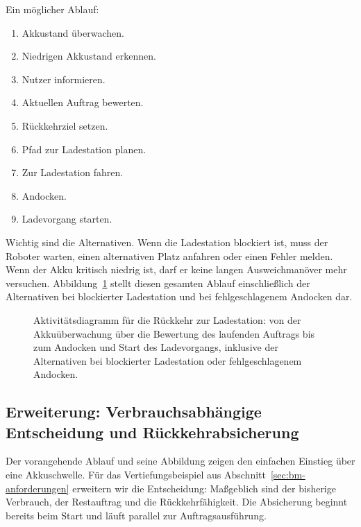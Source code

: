 Ein möglicher Ablauf:

\begin{enumerate}
    \item Akkustand überwachen.
    \item Niedrigen Akkustand erkennen.
    \item Nutzer informieren.
    \item Aktuellen Auftrag bewerten.
    \item Rückkehrziel setzen.
    \item Pfad zur Ladestation planen.
    \item Zur Ladestation fahren.
    \item Andocken.
    \item Ladevorgang starten.
\end{enumerate}

Wichtig sind die Alternativen. Wenn die Ladestation blockiert ist, muss der Roboter warten, einen alternativen Platz anfahren oder einen Fehler melden. Wenn der Akku kritisch niedrig ist, darf er keine langen Ausweichmanöver mehr versuchen. Abbildung~\ref{fig:kap11-aktivitaet-rueckkehr-ladestation} stellt diesen gesamten Ablauf einschließlich der Alternativen bei blockierter Ladestation und bei fehlgeschlagenem Andocken dar.

\begin{figure}[H]
  \centering
  \caption{Aktivitätsdiagramm für die Rückkehr zur Ladestation: von der Akkuüberwachung über die Bewertung des laufenden Auftrags bis zum Andocken und Start des Ladevorgangs, inklusive der Alternativen bei blockierter Ladestation oder fehlgeschlagenem Andocken.}
  \label{fig:kap11-aktivitaet-rueckkehr-ladestation}
\end{figure}

\subsection{Erweiterung: Verbrauchsabhängige Entscheidung und Rückkehrabsicherung}
\label{sec:bm-ablauf}
Der vorangehende Ablauf und seine Abbildung zeigen den einfachen Einstieg über eine Akkuschwelle. Für das Vertiefungsbeispiel aus Abschnitt~\ref{sec:bm-anforderungen} erweitern wir die Entscheidung: Maßgeblich sind der bisherige Verbrauch, der Restauftrag und die Rückkehrfähigkeit. Die Absicherung beginnt bereits beim Start und läuft parallel zur Auftragsausführung.

